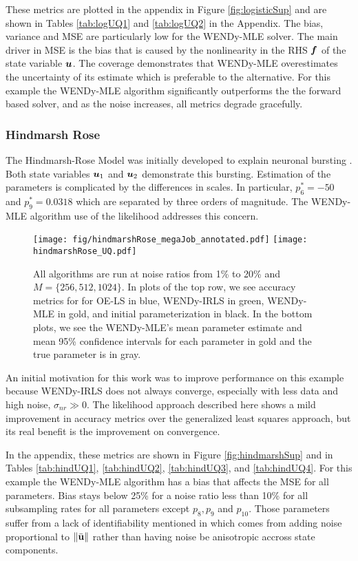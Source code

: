  These metrics are plotted in the appendix in Figure \ref{fig:logisticSup} and are shown in Tables \ref{tab:logUQ1} and \ref{tab:logUQ2} in the Appendix. The bias, variance and MSE are particularly low for the WENDy-MLE solver. The main driver in MSE is the bias that is caused by the nonlinearity in the RHS $\boldsymbol{f}$ of the state variable $\boldsymbol{u}$. The coverage demonstrates that WENDy-MLE overestimates the uncertainty of its estimate which is preferable to the alternative. For this example the WENDy-MLE algorithm significantly outperforms the the forward based solver, and as the noise increases, all metrics degrade gracefully. 

\subsubsection{Hindmarsh Rose} \label{sec:hindmarsh}
The Hindmarsh-Rose Model was initially developed to explain neuronal bursting \citep{HindmarshRose1984ProcRSocLondBBiolSci}. Both state variables $\boldsymbol{u}_1$ and $\boldsymbol{u}_2$ demonstrate this bursting. Estimation of the parameters is complicated by the differences in scales. In particular, $p^*_6 = -50$ and $p^*_9 = 0.0318$ which are separated by three orders of magnitude. The WENDy-MLE algorithm use of the likelihood addresses this concern.
\begin{figure}[H]
	\centering
    \texttt{[image: fig/hindmarshRose\_megaJob\_annotated.pdf]}
	\texttt{[image: hindmarshRose\_UQ.pdf]}
	\caption{All algorithms are run at noise ratios from 1\% to 20\% and $M = \{256, 512, 1024\}$. In plots of the top row, we see accuracy metrics for for OE-LS in blue, WENDy-IRLS in green, WENDy-MLE in gold, and initial parameterization in black. In the bottom plots, we see the WENDy-MLE's mean parameter estimate and mean 95\% confidence intervals for each parameter in gold and the true parameter is in gray.}
	\label{fig:hindMega}
\end{figure}
An initial motivation for this work was to improve performance on this example because WENDy-IRLS does not always converge, especially with less data and high noise, $\sigma_{nr} \gg 0$. The likelihood approach described here shows a mild improvement in accuracy metrics over the generalized least squares approach, but its real benefit is the improvement on convergence.

 In the appendix, these metrics are shown in Figure \ref{fig:hindmarshSup} and in Tables \ref{tab:hindUQ1}, \ref{tab:hindUQ2}, \ref{tab:hindUQ3}, and \ref{tab:hindUQ4}. For this example the WENDy-MLE algorithm has a bias that affects the MSE for all parameters. Bias stays below 25\% for a noise ratio less than 10\% for all subsampling rates for all parameters except $p_8,p_9$ and $p_{10}$. Those parameters suffer from a lack of identifiability mentioned in \citep{BortzMessengerDukic2023BullMathBiol} which comes from adding noise proportional to $\|\bar{\mathbf{u}}\|$ rather than having noise be anisotropic accross state components. 

